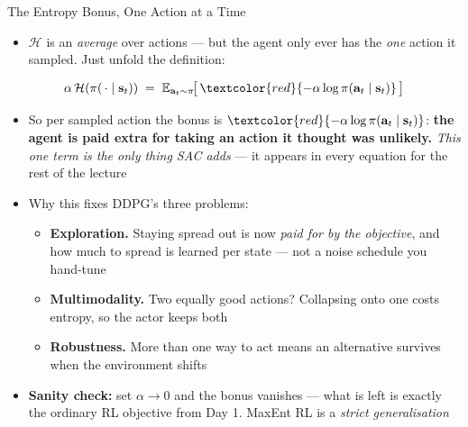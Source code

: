 \begin{frame}{The Entropy Bonus, One Action at a Time}
\footnotesize
\begin{itemize}
    \item $\mathcal{H}$ is an \emph{average} over actions --- but the agent only ever has the \emph{one} action it sampled. Just unfold the definition:
\end{itemize}
\vspace{-0.3em}
\[
\alpha\,\mathcal{H}(\pi(\,\cdot\mid \mathbf{s}_t)) \;=\; \mathbb{E}_{\mathbf{a}_t \sim \pi}\!\big[\, \textcolor{red}{-\alpha \log \pi(\mathbf{a}_t \mid \mathbf{s}_t)} \,\big]
\]
\begin{itemize}
    \item So per sampled action the bonus is $\textcolor{red}{-\alpha\log\pi(\mathbf{a}_t\mid\mathbf{s}_t)}$: \textbf{the agent is paid extra for taking an action it thought was unlikely.} \emph{This one term is the only thing SAC adds} --- it appears in every equation for the rest of the lecture
    \vspace{0.3em}
    \item Why this fixes DDPG's three problems:
    \begin{itemize}
        \item \textbf{Exploration.} Staying spread out is now \emph{paid for by the objective}, and how much to spread is learned per state --- not a noise schedule you hand-tune
        \item \textbf{Multimodality.} Two equally good actions? Collapsing onto one costs entropy, so the actor keeps both
        \item \textbf{Robustness.} More than one way to act means an alternative survives when the environment shifts
    \end{itemize}
    \vspace{0.3em}
    \item \textbf{Sanity check:} set $\alpha \to 0$ and the bonus vanishes --- what is left is exactly the ordinary RL objective from Day 1. MaxEnt RL is a \emph{strict generalisation}
\end{itemize}
\end{frame}

